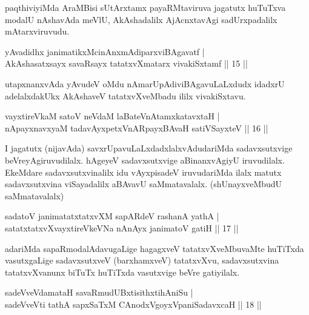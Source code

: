 \begin{artha}
paqthiviyiMda AraMBisi sUtArxtamx payaRMtaviruva jagatutx huTuTxva modalU nAshavAda meVlU, AkAshadalilx AjAcnxtavAgi sadUrxpadalilx mAtarxviruvudu.
\end{artha}

\begin{shl}
yAvadidhx janimatikxMcinAnxmAdiparxviBAgavatf |\\
AkAshasatxsayx savaRsayx tatatxvXmatarx vivakiSxtamf \hfill || 15 ||
\end{shl}

\begin{artha}
utapxnanxvAda yAvudeV oMdu nAmarUpAdiviBAgavuLaLxdudx idadxrU adelalxdakUkx AkAshaveV tatatxvXveMbadu ililx vivakiSxtavu.
\end{artha}

\begin{shl}
vayxtireVkaM satoV neVdaM laBateV\s nAtamxkatavxtaH |\\
nApayxnavxyaM tadavAyxpetxVnARpayxBAvaH satiVSayxteV \hfill || 16 ||
\end{shl}

\begin{artha}
I jagatutx (nijavAda) savxrUpavuLaLxdadxlalxvAdudariMda sadavxsutxvige beVreyAgiruvudilalx. hAgeyeV sadavxsutxvige aBinanxvAgiyU iruvudilalx. EkeMdare sadavxsutxvinalilx idu vAyxpisadeV iruvudariMda ilalx matutx sadavxsutxvina viSayadalilx aBAvavU saMmatavalalx. (shUnayxveMbudU saMmatavalalx)
\end{artha}


\begin{shl}
sadatoV janimatatxtatxvXM sapARdeV rashanA yathA |\\
satatxtatxvXvayxtireVkeVNa nAnAyx janimatoV gatiH \hfill || 17 ||
\end{shl}

\begin{artha}%
adariMda sapaRmodalAdavugaLige hagagxveV tatatxvXveMbuvaMte huTiTxda vasutxgaLige sadavxsutxveV (barxhamxveV) tatatxvXvu, sadavxsutxvina tatatxvXvanunx biTuTx huTiTxda vasutxvige beVre gatiyilalx.
\end{artha}


\begin{shl}
sadeVveVdamataH savaRmudUBxtisithxtihAniSu |\\
sadeVveVti tathA sapxSaTxM CAnodxVgoyxVpaniSadavxcaH \hfill || 18 ||
\end{shl}

